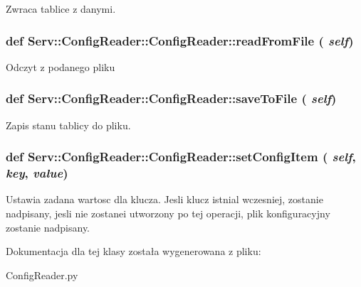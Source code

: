 \begin{DoxyVerb}Zwraca tablice z danymi.\end{DoxyVerb}
 \hypertarget{class_serv_1_1_config_reader_1_1_config_reader_ac8ff5305639fac5691feb7de4ae9ceea}{
\subsubsection[{readFromFile}]{\setlength{\rightskip}{0pt plus 5cm}def Serv::ConfigReader::ConfigReader::readFromFile ( {\em self})}}
\label{class_serv_1_1_config_reader_1_1_config_reader_ac8ff5305639fac5691feb7de4ae9ceea}
\begin{DoxyVerb}Odczyt z podanego pliku\end{DoxyVerb}
 \hypertarget{class_serv_1_1_config_reader_1_1_config_reader_a919cf4af7c9d0eb3a91ef578731edb0a}{
\subsubsection[{saveToFile}]{\setlength{\rightskip}{0pt plus 5cm}def Serv::ConfigReader::ConfigReader::saveToFile ( {\em self})}}
\label{class_serv_1_1_config_reader_1_1_config_reader_a919cf4af7c9d0eb3a91ef578731edb0a}
\begin{DoxyVerb}Zapis stanu tablicy do pliku.\end{DoxyVerb}
 \hypertarget{class_serv_1_1_config_reader_1_1_config_reader_a44baeb28dc94ccbc797ab1164d98fa04}{
\subsubsection[{setConfigItem}]{\setlength{\rightskip}{0pt plus 5cm}def Serv::ConfigReader::ConfigReader::setConfigItem ( {\em self}, \/   {\em key}, \/   {\em value})}}
\label{class_serv_1_1_config_reader_1_1_config_reader_a44baeb28dc94ccbc797ab1164d98fa04}
\begin{DoxyVerb}Ustawia zadana wartosc dla klucza.
Jesli klucz istnial wczesniej, zostanie nadpisany, jesli nie zostanei utworzony
po tej operacji, plik konfiguracyjny zostanie nadpisany.        
\end{DoxyVerb}
 

Dokumentacja dla tej klasy została wygenerowana z pliku:\begin{DoxyCompactItemize}
\item 
ConfigReader.py\end{DoxyCompactItemize}
